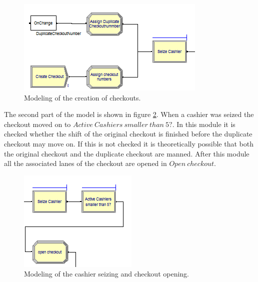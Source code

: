 \begin{figure}[h!]
\begin{center}
	\includegraphics[scale=1]{images/model-description/checkout-creation.PNG}
	\caption{Modeling of the creation of checkouts.}
	\label{fig:createcheckouts}
\end{center}
\end{figure}

The second part of the model is shown in figure \ref{fig:seizeandopen}. When a cashier was seized the checkout moved on to $Active \ Cashiers \ smaller \ than \ 5?$. In this module it is checked whether the shift of the original checkout is finished before the duplicate checkout may move on. If this is not checked it is theoretically possible that both the original checkout and the duplicate checkout are manned. After this module all the associated lanes of the checkout are opened in $Open \ checkout$.

\begin{figure}[h!]
\begin{center}
	\includegraphics[scale=1]{images/model-description/seize-and-open.PNG}
	\caption{Modeling of the cashier seizing and checkout opening.}
	\label{fig:seizeandopen}
\end{center}
\end{figure}

